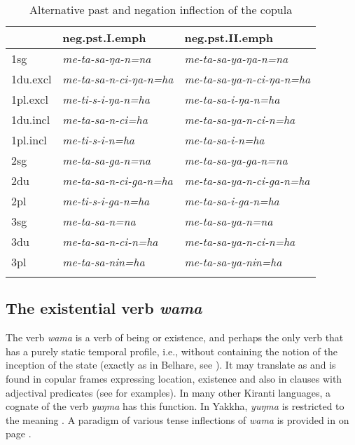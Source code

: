 \begin{table}[htp]
\begin{centering}
\begin{tabular}{lll}
\lsptoprule
  & {\sc neg.pst.I.emph}  & {\sc neg.pst.II.emph} \\
\midrule
{\sc 1sg} & \it  me-ta-sa-ŋa-n=na  & \it  me-ta-sa-ya-ŋa-n=na\\
{\sc 1du.excl} & \it  me-ta-sa-n-ci-ŋa-n=ha  & \it  me-ta-sa-ya-n-ci-ŋa-n=ha\\
{\sc 1pl.excl} & \it   me-ti-s-i-ŋa-n=ha & \it  me-ta-sa-i-ŋa-n=ha\\
{\sc 1du.incl} & \it  me-ta-sa-n-ci=ha & \it  me-ta-sa-ya-n-ci-n=ha\\
{\sc 1pl.incl} & \it  me-ti-s-i-n=ha & \it  me-ta-sa-i-n=ha\\
\midrule
{\sc 2sg} & \it  me-ta-sa-ga-n=na & \it  me-ta-sa-ya-ga-n=na\\
{\sc 2du} & \it  me-ta-sa-n-ci-ga-n=ha & \it  me-ta-sa-ya-n-ci-ga-n=ha\\
{\sc 2pl} & \it   me-ti-s-i-ga-n=ha & \it  me-ta-sa-i-ga-n=ha\\
\midrule
{\sc 3sg} & \it  me-ta-sa-n=na & \it  me-ta-sa-ya-n=na\\
{\sc 3du} & \it  me-ta-sa-n-ci-n=ha & \it  me-ta-sa-ya-n-ci-n=ha\\
{\sc 3pl} & \it  me-ta-sa-nin=ha & \it  me-ta-sa-ya-nin=ha\\
\lspbottomrule
\end{tabular}
\end{centering}
\caption{Alternative past and negation inflection of the copula}\label{meti}
\end{table}



\subsection{The existential verb \emph{wama}}

The verb \emph{wama}  is  a verb of being or existence, and perhaps the only verb that has a purely static temporal profile, i.e., without containing the notion of the inception of the state (exactly as in Belhare, see \citealt[212]{Bickel1996Aspect}). It may translate as  and is found in copular frames expressing location, existence and also in clauses with adjectival predicates (see \Next for examples). In many other Kiranti languages, a cognate of the verb \emph{yuŋma}  has this function. In Yakkha,  \emph{yuŋma} is restricted to the meaning . A paradigm of  various tense inflections of \emph{wama} is provided in  on page \pageref{par-wa-ma}.

